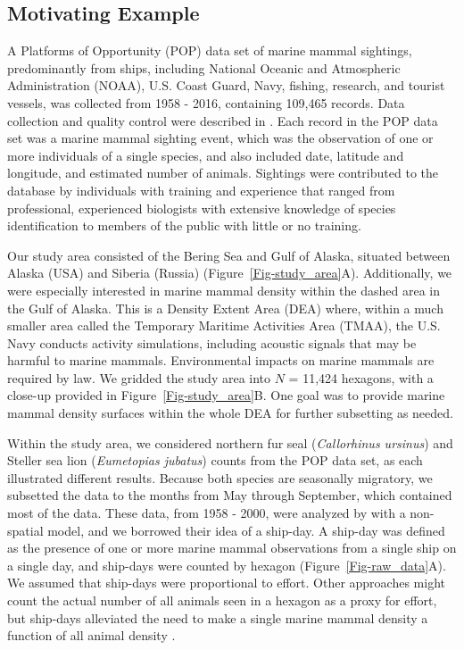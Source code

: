 \documentclass[11pt, titlepage]{article}
\begin{document}
\begin{spacing}{1.9}
\begin{flushleft}

\subsection{Motivating Example} \label{sec:motex}

A Platforms of Opportunity (POP) data set of marine mammal sightings, predominantly from ships, including National Oceanic and Atmospheric Administration (NOAA), U.S. Coast Guard, Navy, fishing, research, and tourist vessels, was collected from 1958 - 2016, containing 109,465 records. Data collection and quality control were described in \citet{HimesBoorEtAl2012Stellersealion}. Each record in the POP data set was a marine mammal sighting event, which was the observation of one or more individuals of a single species, and also included date, latitude and longitude, and estimated number of animals. Sightings were contributed to the database by individuals with training and experience that ranged from professional, experienced biologists with extensive knowledge of species identification to members of the public with little or no training.

Our study area consisted of the Bering Sea and Gulf of Alaska, situated between Alaska (USA) and Siberia (Russia) (Figure~\ref{Fig-study_area}A). Additionally, we were especially interested in marine mammal density within the dashed area in the Gulf of Alaska.  This is a Density Extent Area (DEA) where, within a much smaller area called the Temporary Maritime Activities Area (TMAA), the U.S. Navy conducts activity simulations, including acoustic signals that may be harmful to marine mammals. Environmental impacts on marine mammals are required by law. We gridded the study area into $N$ = 11,424 hexagons, with a close-up provided in Figure~\ref{Fig-study_area}B. One goal was to provide marine mammal density surfaces within the whole DEA for further subsetting as needed. 

Within the study area, we considered northern fur seal (\textit{Callorhinus ursinus}) and Steller sea lion (\textit{Eumetopias jubatus}) counts from the POP data set, as each illustrated different results.  Because both species are seasonally migratory, we subsetted the data to the months from May through September, which contained most of the data. These data, from 1958 - 2000, were analyzed by \citet{HimesBoorEtAl2012Stellersealion} with a non-spatial model, and we borrowed their idea of a ship-day.    A ship-day was defined as the presence of one or more marine mammal observations from a single ship on a single day, and ship-days were counted by hexagon (Figure~\ref{Fig-raw_data}A).  We assumed that ship-days were proportional to effort.  Other approaches might count the actual number of all animals seen in a hexagon as a proxy for effort, but ship-days alleviated the need to make a single marine mammal density a function of all animal density \citep{HimesBoorEtAl2012Stellersealion}.


\end{flushleft}
\end{spacing}
\end{document}

